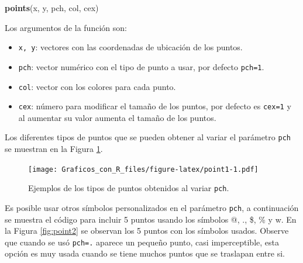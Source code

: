 \documentclass[10pt,]{krantz}
\makeatletter
\newenvironment{Shaded}{\begin{snugshade}}{\end{snugshade}}
\newcommand{\KeywordTok}[1]{\textcolor[rgb]{0.13,0.29,0.53}{\textbf{{#1}}}}
\newcommand{\DataTypeTok}[1]{\textcolor[rgb]{0.13,0.29,0.53}{{#1}}}
\newcommand{\DecValTok}[1]{\textcolor[rgb]{0.00,0.00,0.81}{{#1}}}
\newcommand{\FloatTok}[1]{\textcolor[rgb]{0.00,0.00,0.81}{{#1}}}
\newcommand{\StringTok}[1]{\textcolor[rgb]{0.31,0.60,0.02}{{#1}}}
\newcommand{\NormalTok}[1]{{#1}}
\providecommand{\tightlist}{%
  \setlength{\itemsep}{0pt}\setlength{\parskip}{0pt}}
\newenvironment{kframe}{%
\medskip{}
\setlength{\fboxsep}{.8em}
 \def\at@end@of@kframe{}%
 \ifinner\ifhmode%
  \def\at@end@of@kframe{\end{minipage}}%
  \begin{minipage}{\columnwidth}%
 \fi\fi%
 \def\FrameCommand##1{\hskip\@totalleftmargin \hskip-\fboxsep
 \colorbox{shadecolor}{##1}\hskip-\fboxsep
     \hskip-\linewidth \hskip-\@totalleftmargin \hskip\columnwidth}%
 \MakeFramed {\advance\hsize-\width
   \@totalleftmargin\z@ \linewidth\hsize
   \@setminipage}}%
 {\par\unskip\endMakeFramed%
 \at@end@of@kframe}
\renewenvironment{Shaded}{\begin{kframe}}{\end{kframe}}
\makeatother
\begin{document}
\begin{Shaded}
\begin{Highlighting}[]
\KeywordTok{points}\NormalTok{(x, y, pch, col, cex)}
\end{Highlighting}
\end{Shaded}

Los argumentos de la función son:

\begin{itemize}
\tightlist
\item
  \texttt{x,\ y}: vectores con las coordenadas de ubicación de los
  puntos.
\item
  \texttt{pch}: vector numérico con el tipo de punto a usar, por defecto
  \texttt{pch=1}.
\item
  \texttt{col}: vector con los colores para cada punto.
\item
  \texttt{cex}: número para modificar el tamaño de los puntos, por
  defecto es \texttt{cex=1} y al aumentar su valor aumenta el tamaño de
  los puntos.
\end{itemize}

Los diferentes tipos de puntos que se pueden obtener al variar el
parámetro \texttt{pch} se muestran en la Figura \ref{fig:point1}.

\begin{figure}[htbp]
\centering
\texttt{[image: Graficos\_con\_R\_files/figure-latex/point1-1.pdf]}
\caption{\label{fig:point1}Ejemplos de los tipos de puntos obtenidos al
variar \texttt{pch}.}
\end{figure}

Es posible usar otros símbolos personalizados en el parámetro
\texttt{pch}, a continuación se muestra el código para incluir 5 puntos
usando los símbolos @, ., \$, \% y w. En la Figura \ref{fig:point2} se
observan los 5 puntos con los símbolos usados. Observe que cuando se usó
\texttt{pch=\textquotesingle{}.\textquotesingle{}} aparece un pequeño
punto, casi imperceptible, esta opción es muy usada cuando se tiene
muchos puntos que se traslapan entre si.

\begin{Shaded}
\end{Shaded}
\end{document}

